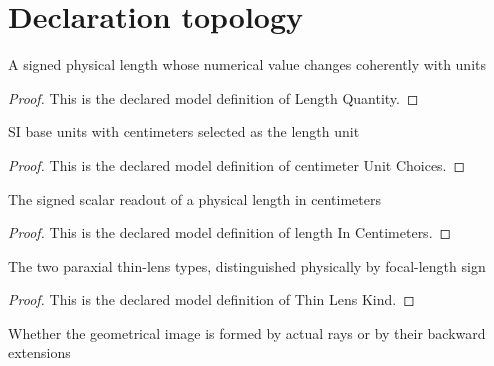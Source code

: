 \section{Declaration topology}
\begin{definition}
  \label{def:physics:phyx-mini-0044:phyxminiproblems-problemphyxmini0044-lengthquantity}
  A signed physical length whose numerical value changes coherently with units
\end{definition}
\begin{proof}
  This is the declared model definition of Length Quantity.
\end{proof}
\begin{definition}
  \label{def:physics:phyx-mini-0044:phyxminiproblems-problemphyxmini0044-centimeterunitchoices}
  SI base units with centimeters selected as the length unit
\end{definition}
\begin{proof}
  This is the declared model definition of centimeter Unit Choices.
\end{proof}
\begin{definition}
  \label{def:physics:phyx-mini-0044:phyxminiproblems-problemphyxmini0044-lengthincentimeters}
  The signed scalar readout of a physical length in centimeters
\end{definition}
\begin{proof}
  This is the declared model definition of length In Centimeters.
\end{proof}
\begin{definition}
  \label{def:physics:phyx-mini-0044:phyxminiproblems-problemphyxmini0044-thinlenskind}
  The two paraxial thin-lens types, distinguished physically by focal-length sign
\end{definition}
\begin{proof}
  This is the declared model definition of Thin Lens Kind.
\end{proof}
\begin{definition}
  \label{def:physics:phyx-mini-0044:phyxminiproblems-problemphyxmini0044-geometricalimagekind}
  Whether the geometrical image is formed by actual rays or by their backward extensions
\end{definition}
